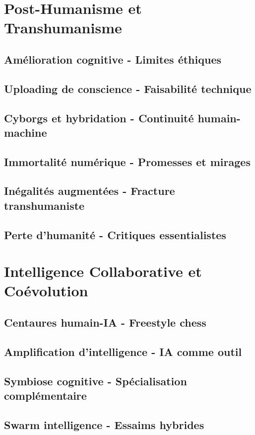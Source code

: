 \documentclass[12pt,a4paper]{book}
\begin{document}
\chapter{Post-Humanisme et Transhumanisme}
\section{Amélioration cognitive - Limites éthiques}
\section{Uploading de conscience - Faisabilité technique}
\section{Cyborgs et hybridation - Continuité humain-machine}
\section{Immortalité numérique - Promesses et mirages}
\section{Inégalités augmentées - Fracture transhumaniste}
\section{Perte d'humanité - Critiques essentialistes}

\chapter{Intelligence Collaborative et Coévolution}
\section{Centaures humain-IA - Freestyle chess}
\section{Amplification d'intelligence - IA comme outil}
\section{Symbiose cognitive - Spécialisation complémentaire}
\section{Swarm intelligence - Essaims hybrides}
\end{document}
